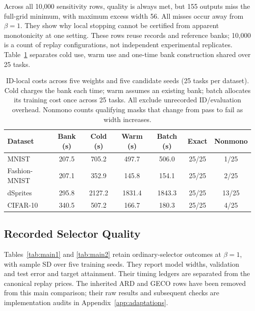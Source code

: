 \documentclass[make,article,submit,pdftex,moreauthors]{Definitions/mdpi}
\begin{document}
Across all 10,000 sensitivity rows, quality is always met, but 155
outputs miss the full-grid minimum, with maximum excess width 56.
All misses occur away from $\beta=1$. They show why local stopping
cannot be certified from apparent monotonicity at one setting.
These rows reuse records and reference banks; 10,000 is a count of
replay configurations, not independent experimental replicates.
Table~\ref{tab:amortization} separates cold use, warm use and one-time
bank construction shared over 25 tasks.
\begin{table}[H]
\caption{ID-local costs across five weights and five candidate seeds (25 tasks per dataset). Cold charges the bank each time; warm assumes an existing bank; batch allocates its training cost once across 25 tasks. All exclude unrecorded ID/evaluation overhead. Nonmono counts qualifying masks that change from pass to fail as width increases.}\label{tab:amortization}
\small
\setlength{\tabcolsep}{3pt}
\begin{tabular*}{\textwidth}{@{\extracolsep{\fill}}lcccccc@{}}
\toprule
Dataset & Bank (s) & Cold (s) & Warm (s) & Batch (s) & Exact & Nonmono \\
\midrule
MNIST & 207.5 & 705.2 & 497.7 & 506.0 & 25/25 & 1/25 \\
Fashion-MNIST & 207.1 & 352.9 & 145.8 & 154.1 & 25/25 & 2/25 \\
dSprites & 295.8 & 2127.2 & 1831.4 & 1843.3 & 25/25 & 13/25 \\
CIFAR-10 & 340.5 & 507.2 & 166.7 & 180.3 & 25/25 & 4/25 \\
\bottomrule\end{tabular*}
\end{table}


\subsection{Recorded Selector Quality}
Tables~\ref{tab:main1} and \ref{tab:main2} retain ordinary-selector
outcomes at $\beta=1$, with sample SD over five training seeds.
They report model widths, validation and test error and target attainment.
Their timing ledgers are separated from the canonical replay prices.
The inherited ARD and GECO rows have been removed from this main
comparison; their raw results and subsequent checks are implementation
audits in Appendix~\ref{app:adaptations}.
\end{document}
